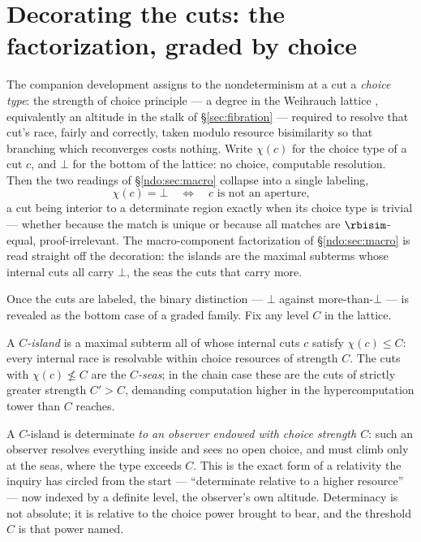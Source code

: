 \section{Decorating the cuts: the factorization, graded by choice}\label{ndo:sec:graded}

The companion development \cite{choicesched} assigns to the nondeterminism at a cut a
\emph{choice type}: the strength of choice principle --- a degree in the Weihrauch lattice
\cite{weihrauch}, equivalently an altitude in the stalk of \S\ref{sec:fibration} --- required to
resolve that cut's race, fairly and correctly, taken modulo resource bisimilarity so that
branching which reconverges costs nothing. Write $\chi(c)$ for the choice type of a cut $c$, and
$\bot$ for the bottom of the lattice: no choice, computable resolution. Then the two readings of
\S\ref{ndo:sec:macro} collapse into a single labeling,
\[
\chi(c) = \bot \quad\Longleftrightarrow\quad c \text{ is not an aperture,}
\]
a cut being interior to a determinate region exactly when its choice type is trivial --- whether
because the match is unique or because all matches are $\rbisim$-equal, proof-irrelevant. The
macro-component factorization of \S\ref{ndo:sec:macro} is read straight off the decoration: the islands
are the maximal subterms whose internal cuts all carry $\bot$, the seas the cuts that carry more.

Once the cuts are labeled, the binary distinction --- $\bot$ against more-than-$\bot$ --- is
revealed as the bottom case of a graded family. Fix any level $C$ in the lattice.

\begin{definition}[$C$-island]\label{ndo:def:cisland}
A \emph{$C$-island} is a maximal subterm all of whose internal cuts $c$ satisfy $\chi(c) \le C$:
every internal race is resolvable within choice resources of strength $C$. The cuts with
$\chi(c) \not\le C$ are the \emph{$C$-seas}; in the chain case these are the cuts of strictly
greater strength $C' > C$, demanding computation higher in the hypercomputation tower than $C$
reaches.
\end{definition}

\noindent
A $C$-island is determinate \emph{to an observer endowed with choice strength $C$}: such an
observer resolves everything inside and sees no open choice, and must climb only at the seas, where
the type exceeds $C$. This is the exact form of a relativity the inquiry has circled from the start
--- ``determinate relative to a higher resource'' --- now indexed by a definite level, the
observer's own altitude. Determinacy is not absolute; it is relative to the choice power brought to
bear, and the threshold $C$ is that power named.


